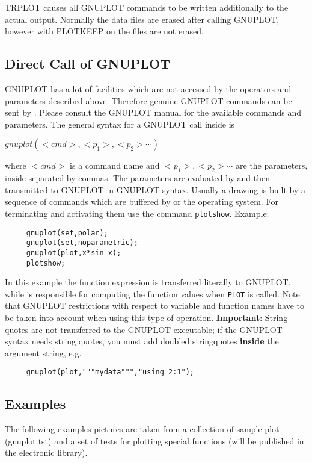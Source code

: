 TRPLOT causes all GNUPLOT commands
to be written additionally to the actual
{\REDUCE} output. Normally the data files are
erased after calling GNUPLOT, however with PLOTKEEP on
the files are not erased.

\subsection{Direct Call of GNUPLOT}

GNUPLOT has a lot of facilities which are not accessed by
the operators and parameters described above. Therefore
genuine GNUPLOT commands can be sent by {\REDUCE}.
Please consult the GNUPLOT manual for the available
commands and parameters. The general syntax for a GNUPLOT call
inside {\REDUCE} is

    $gnuplot(<cmd>,<p_1>,<p_2> \cdots)$

where $<cmd>$ is a command name and $<p_1>,<p_2> \cdots$
are the parameters, inside {\REDUCE} separated by
commas. The parameters are evaluated by
{\REDUCE} and then transmitted to GNUPLOT in
GNUPLOT syntax. Usually a drawing is built by a
sequence of commands which are buffered 
by {\REDUCE} or the operating
system. For terminating and activating them use the {\REDUCE}
command \verb+plotshow+. Example:
\begin{verbatim}
     gnuplot(set,polar);
     gnuplot(set,noparametric);
     gnuplot(plot,x*sin x);
     plotshow;
\end{verbatim}
In this example the function expression is transferred literally
to GNUPLOT, while {\REDUCE}
is responsible for computing the function values when \verb+PLOT+ is called.
Note that GNUPLOT restrictions with respect to variable
and function names have to be taken into account when
using this type of operation. {\bf Important}: String quotes are
not transferred to the GNUPLOT executable; if the GNUPLOT syntax
needs string quotes, you must add doubled stringquotes  {\bf inside}
the argument string, e.g.
\begin{verbatim}
     gnuplot(plot,"""mydata""","using 2:1");
\end{verbatim}

\subsection{Examples}

The following examples pictures are taken from a collection of sample
plot (gnuplot.tst) and a set of tests for plotting special functions
(will be published in the {\REDUCE} electronic library).

